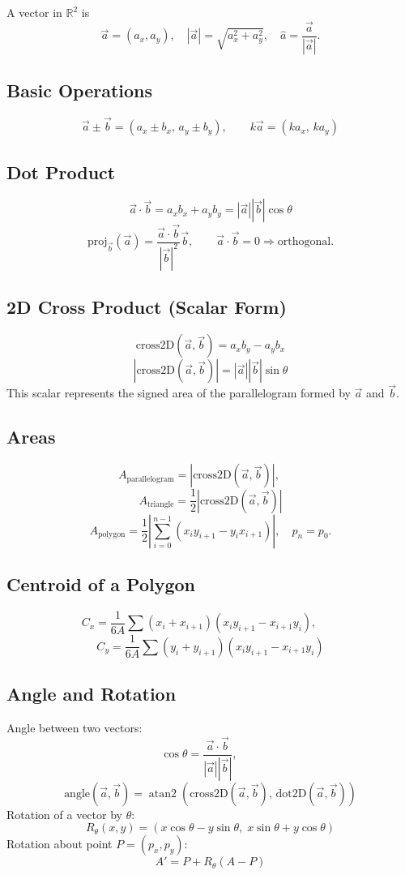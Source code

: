 A vector in $\mathbb{R}^2$ is
\[
\vec{a} = (a_x, a_y), \quad
|\vec{a}| = \sqrt{a_x^2 + a_y^2}, \quad
\hat{a} = \frac{\vec{a}}{|\vec{a}|}.
\]

\subsection*{Basic Operations}
\[
\vec{a} \pm \vec{b} = (a_x \pm b_x,\, a_y \pm b_y), \qquad
k\vec{a} = (k a_x,\, k a_y)
\]

\subsection*{Dot Product}
\[
\vec{a}\cdot\vec{b} = a_x b_x + a_y b_y = |\vec{a}||\vec{b}|\cos\theta
\]
\[
\text{proj}_{\vec{b}}(\vec{a}) = \frac{\vec{a}\cdot\vec{b}}{|\vec{b}|^2}\vec{b}, \qquad
\vec{a}\cdot\vec{b} = 0 \Rightarrow \text{orthogonal.}
\]

\subsection*{2D Cross Product (Scalar Form)}
\[
\text{cross2D}(\vec{a},\vec{b}) = a_x b_y - a_y b_x
\]
\[
|\text{cross2D}(\vec{a},\vec{b})| = |\vec{a}||\vec{b}|\sin\theta
\]
This scalar represents the signed area of the parallelogram formed by $\vec{a}$ and $\vec{b}$.

\subsection*{Areas}
\[
A_{\text{parallelogram}} = |\text{cross2D}(\vec{a},\vec{b})|, \qquad
\]
\[
A_{\text{triangle}} = \frac{1}{2}|\text{cross2D}(\vec{a},\vec{b})|
\]
\[
A_{\text{polygon}} =
\frac{1}{2}\left|\sum_{i=0}^{n-1} (x_i y_{i+1} - y_i x_{i+1})\right|,
\quad p_n = p_0.
\]

\subsection*{Centroid of a Polygon}
\[
C_x = \frac{1}{6A}\sum (x_i + x_{i+1})(x_i y_{i+1} - x_{i+1} y_i), \qquad
\]
\[
C_y = \frac{1}{6A}\sum (y_i + y_{i+1})(x_i y_{i+1} - x_{i+1} y_i)
\]
\subsection*{Angle and Rotation}
Angle between two vectors:
\[
\cos\theta = \frac{\vec{a}\cdot\vec{b}}{|\vec{a}||\vec{b}|}, \qquad
\]
\[
\text{angle}(\vec{a},\vec{b}) = \operatorname{atan2}(\text{cross2D}(\vec{a},\vec{b}),\, \text{dot2D}(\vec{a},\vec{b}))
\]
Rotation of a vector by $\theta$:
\[
R_\theta(x,y) = (x\cos\theta - y\sin\theta,\; x\sin\theta + y\cos\theta)
\]
Rotation about point $P=(p_x,p_y)$:
\[
A' = P + R_\theta(A - P)
\]

